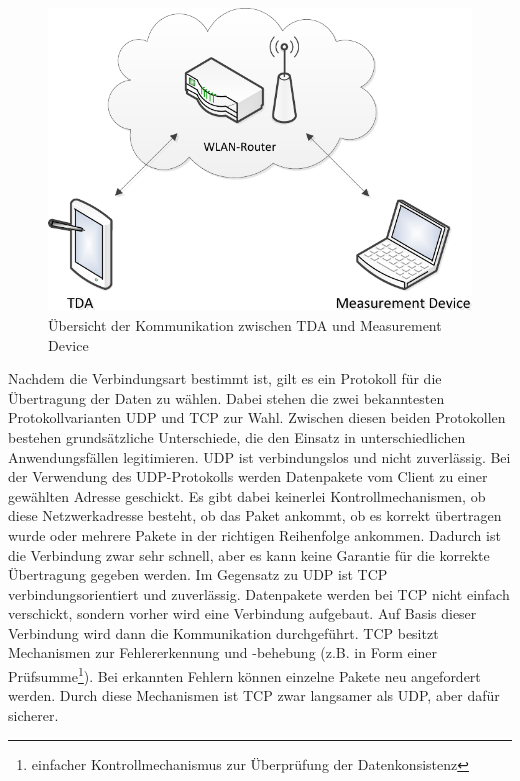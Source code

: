 \documentclass[12pt,a4paper]{report}
\begin{document}
\begin{figure}[H]
\begin{center}
\includegraphics[scale=0.8]{Darstellungen/UebersichtKommunikationCaptureDevice2}
\caption{Übersicht der Kommunikation zwischen TDA und Measurement Device}\label{pic:Uebersicht Kommunikation TDA Measurement Device}
\end{center}
\end{figure}

\noindent Nachdem die Verbindungsart bestimmt ist, gilt es ein Protokoll für die Übertragung der Daten zu wählen. Dabei stehen die zwei bekanntesten Protokollvarianten UDP und TCP zur Wahl. Zwischen diesen beiden Protokollen bestehen grundsätzliche Unterschiede, die den Einsatz in unterschiedlichen Anwendungsfällen legitimieren. UDP ist verbindungslos und nicht zuverlässig. Bei der Verwendung des UDP-Protokolls werden Datenpakete vom Client zu einer gewählten Adresse geschickt. Es gibt dabei keinerlei Kontrollmechanismen, ob diese Netzwerkadresse besteht, ob das Paket ankommt, ob es korrekt übertragen wurde oder mehrere Pakete in der richtigen Reihenfolge ankommen. Dadurch ist die Verbindung zwar sehr schnell, aber es kann keine Garantie für die korrekte Übertragung gegeben werden. Im Gegensatz zu UDP ist TCP verbindungsorientiert und zuverlässig. Datenpakete werden bei TCP nicht einfach verschickt, sondern vorher wird eine Verbindung aufgebaut. Auf Basis dieser Verbindung wird dann die Kommunikation durchgeführt. TCP besitzt Mechanismen zur Fehlererkennung und -behebung (z.B. in Form einer Prüfsumme\footnote{einfacher Kontrollmechanismus zur Überprüfung der Datenkonsistenz}). Bei erkannten Fehlern können einzelne Pakete neu angefordert werden. Durch diese Mechanismen ist TCP zwar langsamer als UDP, aber dafür sicherer.
\end{document}
